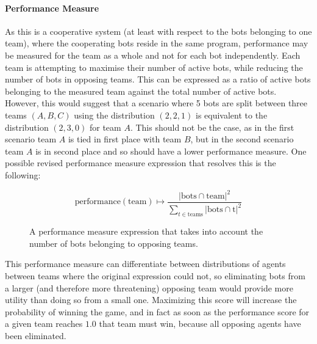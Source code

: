 \documentclass[a4paper,10pt]{article}
\begin{document}
\paragraph{Performance Measure}
As this is a cooperative system (at least with respect to the bots belonging to one team), where the cooperating bots reside in the same program, performance may be measured for the team as a whole and not for each bot independently. Each team is attempting to maximise their number of active bots, while reducing the number of bots in opposing teams. This can be expressed as a ratio of active bots belonging to the measured team against the total number of active bots. However, this would suggest that a scenario where 5 bots are split between three teams $(A, B, C)$ using the distribution $(2, 2, 1)$ is equivalent to the distribution $(2, 3, 0)$ for team $A$. This should not be the case, as in the first scenario team $A$ is tied in first place with team $B$, but in the second scenario team $A$ is in second place and so should have a lower performance measure. One possible revised performance measure expression that resolves this is the following:

\begin{figure}[ht]
  \centering
  \begin{minipage}{0.8\textwidth}
    $$
      \text{performance}\left(\text{team}\right) \mapsto \frac
        {\left|\text{bots} \cap \text{team}\right|^2}
        {\sum_{t \in \text{teams}} \left|\text{bots} \cap \text{t}\right|^2}
    $$
    \caption{A performance measure expression that takes into account the number of bots belonging to opposing teams.}
  \end{minipage}
\end{figure}

\noindent
This performance measure can differentiate between distributions of agents between teams where the original expression could not, so eliminating bots from a larger (and therefore more threatening) opposing team would provide more utility than doing so from a small one. Maximizing this score will increase the probability of winning the game, and in fact as soon as the performance score for a given team reaches $1.0$ that team must win, because all opposing agents have been eliminated.
\end{document}
